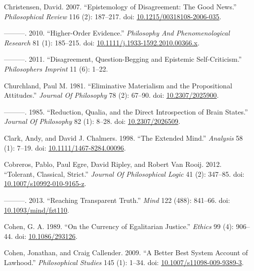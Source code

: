 \documentclass[
  10pt,
  letterpaper,
  DIV=11,
  numbers=noendperiod,
  twoside]{scrartcl}
\newlength{\cslhangindent}
\newenvironment{CSLReferences}[2] %
 {\begin{list}{}{%
  \setlength{\itemindent}{0pt}
  \setlength{\leftmargin}{0pt}
  \setlength{\parsep}{0pt}
  \ifodd #1
   \setlength{\leftmargin}{\cslhangindent}
   \setlength{\itemindent}{-1\cslhangindent}
  \fi
  \setlength{\itemsep}{#2\baselineskip}}}
 {\end{list}}
\begin{document}
\begin{CSLReferences}{1}{0}
Christensen, David. 2007. {``Epistemology of Disagreement: The Good
News.''} \emph{Philosophical Review} 116 (2): 187--217. doi:
\href{https://doi.org/10.1215/00318108-2006-035}{10.1215/00318108-2006-035}.

---------. 2010. {``Higher-Order Evidence.''} \emph{Philosophy And
Phenomenological Research} 81 (1): 185--215. doi:
\href{https://doi.org/10.1111/j.1933-1592.2010.00366.x}{10.1111/j.1933-1592.2010.00366.x}.

---------. 2011. {``Disagreement, Question-Begging and Epistemic
Self-Criticism.''} \emph{Philosophers Imprint} 11 (6): 1--22.

Churchland, Paul M. 1981. {``Eliminative Materialism and the
Propositional Attitudes.''} \emph{Journal Of Philosophy} 78 (2): 67--90.
doi: \href{https://doi.org/10.2307/2025900}{10.2307/2025900}.

---------. 1985. {``Reduction, Qualia, and the Direct Introspection of
Brain States.''} \emph{Journal Of Philosophy} 82 (1): 8--28. doi:
\href{https://doi.org/10.2307/2026509}{10.2307/2026509}.

Clark, Andy, and David J. Chalmers. 1998. {``The Extended Mind.''}
\emph{Analysis} 58 (1): 7--19. doi:
\href{https://doi.org/10.1111/1467-8284.00096}{10.1111/1467-8284.00096}.

Cobreros, Pablo, Paul Egre, David Ripley, and Robert Van Rooij. 2012.
{``Tolerant, Classical, Strict.''} \emph{Journal Of Philosophical Logic}
41 (2): 347--85. doi:
\href{https://doi.org/10.1007/s10992-010-9165-z}{10.1007/s10992-010-9165-z}.

---------. 2013. {``Reaching Transparent Truth.''} \emph{Mind} 122
(488): 841--66. doi:
\href{https://doi.org/10.1093/mind/fzt110}{10.1093/mind/fzt110}.

Cohen, G. A. 1989. {``On the Currency of Egalitarian Justice.''}
\emph{Ethics} 99 (4): 906--44. doi:
\href{https://doi.org/10.1086/293126}{10.1086/293126}.

Cohen, Jonathan, and Craig Callender. 2009. {``A Better Best System
Account of Lawhood.''} \emph{Philosophical Studies} 145 (1): 1--34. doi:
\href{https://doi.org/10.1007/s11098-009-9389-3}{10.1007/s11098-009-9389-3}.


\end{CSLReferences}
\end{document}

